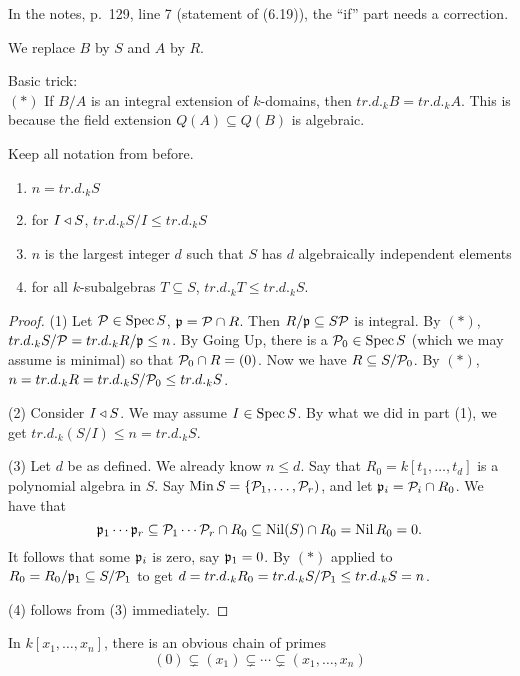 \setcounter{lecture}{41}

 In the notes, p.~129, line 7 (statement of (6.19)), the ``if'' part needs a correction.

 We replace $B$ by $S$ and $A$ by $R$.

 Basic trick:\\
 $(\ast)$ If $B/A$ is an integral extension of $k$-domains, then $tr.d._k B=tr.d._k A$.
 This is because the field extension $Q(A)\subseteq Q(B)$ is algebraic.

 \begin{theorem}
   Keep all notation from before.
   \begin{enumerate}
     \item $n=tr.d._k S$
     \item for $I\< S$, $tr.d._k S/I\le tr.d._k S$
     \item $n$ is the largest integer $d$ such that $S$ has $d$ algebraically independent elements
     \item for all $k$-subalgebras $T\subseteq S$, $tr.d._k T\le tr.d._k S$.
   \end{enumerate}
 \end{theorem}
 \begin{proof}
   (1) Let $\P\in \spec S$, $\p=\P\cap R$. Then $R/\p\subseteq S\P$ is integral. By
   $(\ast)$, $tr.d._k S/\P = tr.d._k R/\p\le n$. By Going Up, there is a $\P_0\in \spec
   S$ (which we may assume is minimal) so that $\P_0\cap R=(0)$. Now we have $R\subseteq
   S/\P_0$. By $(\ast)$, $n=tr.d._k R= tr.d._k S/\P_0\le tr.d._k S$.

   (2) Consider $I\< S$. We may assume $I\in \spec S$. By what we did in part (1), we get
   $tr.d._k (S/I)\le n=tr.d._k S$.

   (3) Let $d$ be as defined. We already know $n\le d$. Say that $R_0=k[t_1,\dots, t_d]$
   is a polynomial algebra in $S$. Say $\Min S=\{\P_1,\dots, \P_r)$, and let $\p_i =
   \P_i\cap R_0$. We have that
   \[
   \p_1\cdots \p_r \subseteq \P_1\cdots \P_r \cap R_0 \subseteq \nil (S)\cap R_0 = \nil R_0 =
   0.
   \]
   It follows that some $\p_i$ is zero, say $\p_1=0$. By $(\ast)$ applied to
   $R_0=R_0/\p_1\subseteq S/\P_1$ to get $d=tr.d._k R_0 = tr.d._k S/\P_1 \le tr.d._k
   S=n$.

   (4) follows from (3) immediately.
 \end{proof}
 In $k[x_1,\dots, x_n]$, there is an obvious chain of primes
 \[
  (0)\subsetneq (x_1)\subsetneq \cdots \subsetneq (x_1,\dots, x_n)
 \]
